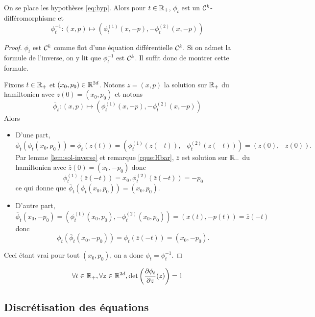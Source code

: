 \documentclass[10pt,a4paper]{article}
\begin{document}
\begin{Prop}[réversibilité]\label{prop:rev}
	On se place les hypothèses \eqref{eq:hyp}. Alors pour $t \in \mathbb{R}_+$, $\phi_t$ est un $\mathcal{C}^k$-différomorphisme et
	$$
	\phi_t^{-1} : (x,p) \mapsto (\phi_t^{(1)}(x, -p), - \phi_t^{(2)}(x, -p))
	$$
\end{Prop}
\begin{proof}
	$\phi_t$ est $\mathcal{C}^k$ comme flot d'une équation différentielle $\mathcal{C}^k$. Si on admet la formule de l'inverse, on y lit que $\phi_t^{-1}$ est $\mathcal{C}^k$. Il suffit donc de montrer cette formule.

	Fixons $t \in \mathbb{R}_+$ et $(x_0,p_0) \in \mathbb{R}^{2d}$. Notons $z=(x,p)$ la solution sur $\mathbb{R}_+$ du hamiltonien avec $z(0) = (x_0,p_0)$ et notons
	$$
	\bar \phi_t : (x,p) \mapsto (\phi_t^{(1)}(x, -p), - \phi_t^{(2)}(x, -p))
	$$
	Alors
	\begin{itemize}
		\item D'une part,
		$$
		\bar \phi_t(\phi_t(x_0,p_0)) = \bar \phi_t(z(t)) = (\phi_t^{(1)}(\bar z(-t)), - \phi_t^{(2)}(\bar z(-t))) = (\bar z(0), - \bar z(0)).
		$$
		Par lemme \ref{lem:sol-inverse} et remarque \ref{rque:Hbar}, $\bar z$ est solution sur $\mathbb{R}_-$ du hamiltonien avec $\bar z(0) = (x_0,-p_0)$ donc
		$$
		\phi_t^{(1)}(\bar z(-t)) = x_0, \phi_t^{(2)}(\bar z(-t)) = -p_0
		$$
		ce qui donne que $\bar \phi_t(\phi_t(x_0,p_0)) = (x_0,p_0)$.

		\item D'autre part,
		$$
		\bar \phi_t(x_0,-p_0) = (\phi_t^{(1)}(x_0, p_0), - \phi_t^{(2)}(x_0, p_0)) = (x(t),-p(t)) = \bar z(-t)
		$$
		donc
		$$
		\phi_t (\bar \phi_t(x_0,-p_0)) = \phi_t(\bar z(-t)) = (x_0,-p_0).
		$$
	\end{itemize}
	Ceci étant vrai pour tout $(x_0,p_0)$, on a donc $\bar \phi_t = \phi_t^{-1}$.
\end{proof}


\begin{Prop}\label{prop:vol}
	$$
	\forall t \in \mathbb{R}_+, \forall z \in \mathbb{R}^{2d}, \det \left( \frac{\partial \phi_t}{\partial z}(z) \right) = 1
	$$
\end{Prop}

\subsection{Discrétisation des équations}

\end{document}
